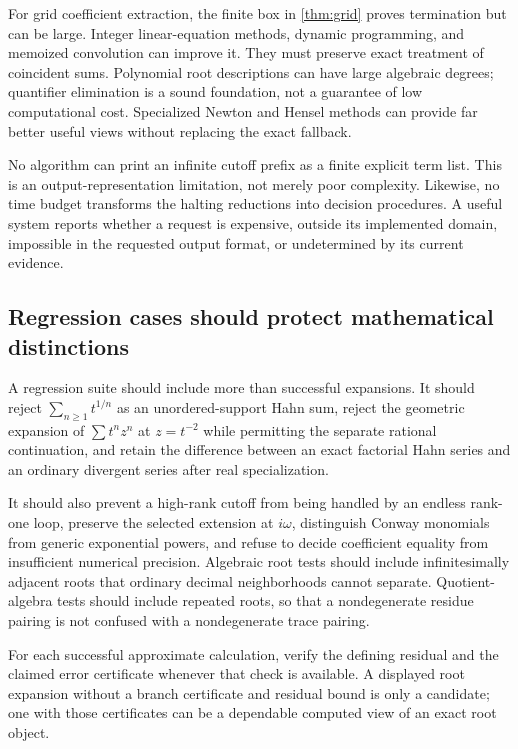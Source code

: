\documentclass[11pt,letterpaper]{article}
\numberwithin{equation}{section}
\theoremstyle{definition}
\theoremstyle{remark}\newtheorem{remark}[theorem]{Remark}
\begin{document}
For grid coefficient extraction, the finite box in \cref{thm:grid} proves
termination but can be large. Integer linear-equation methods, dynamic
programming, and memoized convolution can improve it. They must preserve
exact treatment of coincident sums. Polynomial root descriptions can have
large algebraic degrees; quantifier elimination is a sound foundation, not
a guarantee of low computational cost. Specialized Newton and Hensel methods
can provide far better useful views without replacing the exact fallback.

No algorithm can print an infinite cutoff prefix as a finite explicit term
list. This is an output-representation limitation, not merely poor complexity.
Likewise, no time budget transforms the halting reductions into decision
procedures. A useful system reports whether a request is expensive, outside
its implemented domain, impossible in the requested output format, or
undetermined by its current evidence.

\subsection{Regression cases should protect mathematical distinctions}
A regression suite should include more than successful expansions. It should
reject $\sum_{n\ge1}t^{1/n}$ as an unordered-support Hahn sum, reject the
geometric expansion of $\sum t^nz^n$ at $z=t^{-2}$ while permitting the
separate rational continuation, and retain the difference between an exact
factorial Hahn series and an ordinary divergent series after real
specialization.

It should also prevent a high-rank cutoff from being handled by an endless
rank-one loop, preserve the selected extension at $i\omega$, distinguish
Conway monomials from generic exponential powers, and refuse to decide
coefficient equality from insufficient numerical precision. Algebraic root
tests should include infinitesimally adjacent roots that ordinary decimal
neighborhoods cannot separate. Quotient-algebra tests should include repeated
roots, so that a nondegenerate residue pairing is not confused with a
nondegenerate trace pairing.

For each successful approximate calculation, verify the defining residual
and the claimed error certificate whenever that check is available. A displayed
root expansion without a branch certificate and residual bound is only a
candidate; one with those certificates can be a dependable computed view of
an exact root object.
\end{document}
